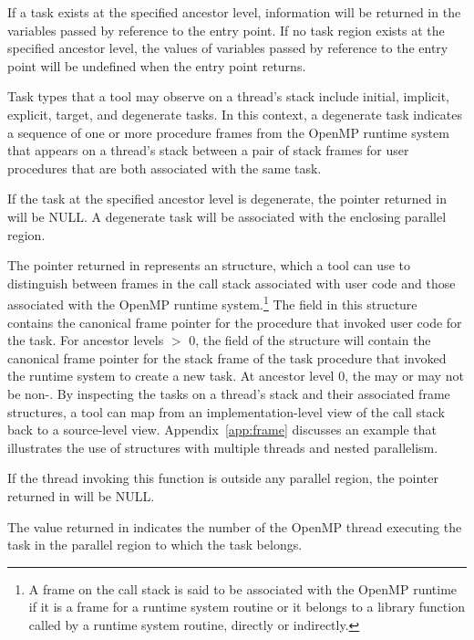 If a task exists at the specified ancestor level, information
will be returned in the variables passed by reference to the entry
point.  If no task region exists at the specified ancestor level, the
values of variables passed by reference to the entry point will be
undefined when the entry point returns.

Task types that a tool may observe on a thread's stack include 
initial, implicit, explicit, target, and degenerate tasks. 
In this context, 
a degenerate task indicates a sequence of one or more procedure frames 
from the OpenMP runtime system that appears on a thread's stack between
a pair of stack frames for user procedures that are both associated 
with the same task. 

If the task at the specified ancestor level is degenerate, the
pointer returned in  will be NULL.  A degenerate
task will be associated with the enclosing parallel region.  

The pointer returned in  represents an
 structure, which
a tool can use to distinguish between frames in the call stack 
associated with user code and those associated with
the OpenMP runtime system.\footnote{A frame 
on the call stack is said to be associated with 
the OpenMP runtime if it is a frame for a runtime system
routine or it belongs to a library function called by a runtime
system routine, directly or indirectly.} 
The  field in this structure contains the
canonical frame pointer for the procedure that invoked 
user code for the task. 
For ancestor levels $>$ 0, the 
 field of
the structure will contain the canonical frame pointer for the 
stack frame of the task procedure that invoked the runtime system to
create a new task. At ancestor level 0, the  may or
may not be non-. 
By inspecting the tasks on a thread's stack and their associated frame
structures,
a tool can map from an implementation-level view of the call stack
back to a source-level view.
Appendix~\ref{app:frame} discusses an example that
illustrates the use of  structures with multiple
threads and nested parallelism.

If the thread invoking this function is outside any parallel region,
the pointer returned in  will be NULL.  

The value returned in  indicates the number of the
OpenMP thread executing the task in the parallel region to which the
task belongs.

